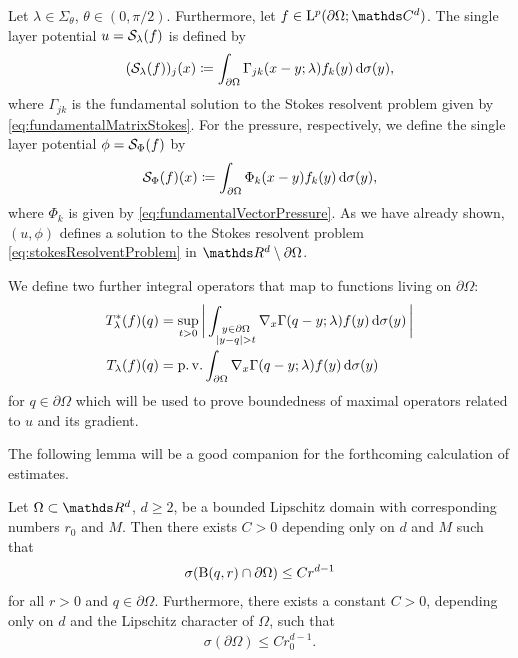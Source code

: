 Let $\lambda \in \Sigma_\theta$, $\theta \in (0,\pi/2)$. 
Furthermore, let $f \in \Ell^p(\partial\Omega; \C^d)$. 
The single layer potential $u = \mathcal{S}_\lambda(f)$ is defined by
\begin{align}
  \label{eq:defSingleLayer}
  (\mathcal{S}_\lambda(f))_j(x) 
  \coloneqq \int_{\partial\Omega} \Gamma_{jk}(x - y; \lambda) f_k(y) \, {\operatorname{d}\!{\sigma}}(y),
\end{align}
where $\Gamma_{jk}$ is the fundamental solution to the Stokes resolvent problem given by \eqref{eq:fundamentalMatrixStokes}.
For the pressure, respectively, we define the single layer potential $\phi = \mathcal{S}_\Phi(f)$ by
\begin{align}
  \label{eq:defSingleLayerPressure}
  \mathcal{S}_{\Phi}(f)(x) \coloneqq \int_{\partial\Omega} \Phi_k(x - y) f_k(y) \, {\operatorname{d}\!{\sigma}}(y),
\end{align}
where $\Phi_k$ is given by \eqref{eq:fundamentalVectorPressure}.
As we have already shown, $(u,\phi)$ defines a solution to the Stokes resolvent problem \eqref{eq:stokesResolventProblem} in $\R^d \setminus \partial\Omega$.

We define two further integral operators that map to functions living on $\partial\Omega$:
\begin{align}
  T_\lambda^*(f)(q) &= \sup_{t > 0} \bigg| \int_{\substack{y \in \partial\Omega \\ |y - q| > t}} \nabla_x \Gamma(q - y; \lambda) f(y) \, {\operatorname{d}\!{\sigma}}(y) \, \bigg| \label{eq:supTOperator}\\
  T_\lambda(f)(q) &= \operatorname{p. v.} \int_{\partial\Omega} \nabla_x \Gamma(q - y; \lambda) f(y) \, {\operatorname{d}\!{\sigma}}(y) \label{eq:pvTOperator}
\end{align}
for $q \in \partial\Omega$ which will be used to prove boundedness of maximal operators related to $u$ and its gradient.

The following lemma will be a good companion for the forthcoming calculation of estimates.
\begin{lem}
  \label{lem:compareBoundaryWithBall}
  Let $\Omega \subset \R^d$, $d \geq 2$, be a bounded Lipschitz domain with corresponding numbers $r_0$ and $M$.
  Then there exists $C > 0$ depending only on $d$ and $M$ such that
  \begin{align*}
    \sigma(\mathrm{B}(q,r) \cap \partial\Omega) \leq C r^{d -1}
  \end{align*}
  for all $r > 0$ and $q \in \partial\Omega$.
  Furthermore, there exists a constant $C > 0$, depending only on $d$ and the Lipschitz character of $\Omega$, such that
  \begin{align*}
    \sigma(\partial\Omega) \leq C r_0^{d - 1}.
\end{align*}
\end{lem}


